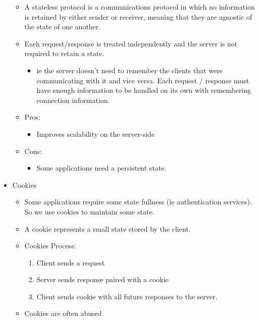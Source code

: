 \documentclass[]{article}
\providecommand{\tightlist}{%
  \setlength{\itemsep}{0pt}\setlength{\parskip}{0pt}}
\begin{document}
\begin{itemize}
  \begin{itemize}
  \tightlist
  \item
    A stateless protocol is a communications protocol in which no
    information is retained by either sender or receiver, meaning that
    they are agnostic of the state of one another.
  \item
    Each request/response is treated independently and the server is not
    required to retain a state.

    \begin{itemize}
    \tightlist
    \item
      ie the server doesn't need to remember the clients that were
      communicating with it and vice versa. Each request / response must
      have enough information to be handled on its own with remembering
      connection information.
    \end{itemize}
  \item
    Pros:

    \begin{itemize}
    \tightlist
    \item
      Improves scalability on the server-side
    \end{itemize}
  \item
    Cons:

    \begin{itemize}
    \tightlist
    \item
      Some applications need a persistent state.
    \end{itemize}
  \end{itemize}
\item
  Cookies

  \begin{itemize}
  \tightlist
  \item
    Some applications require some state fullness (ie authentication
    services). So we use cookies to maintain some state.
  \item
    A cookie represents a small state stored by the client.
  \item
    Cookies Process:

    \begin{enumerate}
    \def\labelenumi{\arabic{enumi}.}
    \tightlist
    \item
      Client sends a request
    \item
      Server sends response paired with a cookie
    \item
      Client sends cookie with all future responses to the server.
    \end{enumerate}
  \item
    Cookies are often abused


\end{itemize}
\end{itemize}
\end{document}
